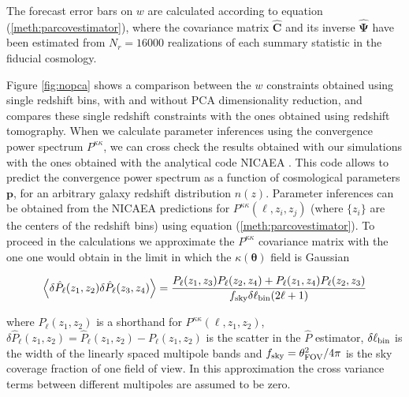\documentclass[reprint,aps,prd,superscriptaddress,showkeys,showpacs]{revtex4-1}
\newcommand{\bb}[1]{\mathbf{#1}}
\newcommand{\bbh}[1]{\mathbf{\hat{#1}}}
\newcommand{\h}[1]{\hat{#1}}
\begin{document}
The forecast error bars on $w$ are calculated according to equation (\ref{meth:parcovestimator}), where the covariance matrix $\bbh{C}$ and its inverse $\bbh{\Psi}$ have been estimated from $N_r=16000$ realizations of each summary statistic in the fiducial cosmology.

Figure \ref{fig:nopca} shows a comparison between the $w$ constraints obtained using single redshift bins, with and without PCA dimensionality reduction, and compares these single redshift constraints with the ones obtained using redshift tomography. When we calculate parameter inferences using the convergence power spectrum $P^{\kappa\kappa}$, we can cross check the results obtained with our simulations with the ones obtained with the analytical code NICAEA \citep{Nicaea}. This code allows to predict the convergence power spectrum as a function of cosmological parameters $\bb{p}$, for an arbitrary galaxy redshift distribution $n(z)$. Parameter inferences can be obtained from the NICAEA predictions for $P^{\kappa\kappa}(\ell,z_i,z_j)$ (where $\{z_i\}$ are the centers of the redshift bins) using equation (\ref{meth:parcovestimator}). To proceed in the calculations we approximate the $P^{\kappa\kappa}$ covariance matrix with the one one would obtain in the limit in which the $\kappa(\pmb{\theta})$ field is Gaussian

\begin{widetext}
\begin{equation}
\label{meth:gausspcov}
\left\langle\delta\h{P}_\ell(z_1,z_2)\delta\h{P}_\ell(z_3,z_4)\right\rangle = \frac{P_\ell(z_1,z_3)P_\ell(z_2,z_4)+P_\ell(z_1,z_4)P_\ell(z_2,z_3)}{f_{\rm sky}\delta\ell_{\rm bin}(2\ell+1)}
\end{equation} 
\end{widetext}
%
where $P_\ell(z_1,z_2)$ is a shorthand for $P^{\kappa\kappa}(\ell,z_1,z_2)$, $\delta\h{P}_\ell(z_1,z_2)=\h{P}_\ell(z_1,z_2) - P_\ell(z_1,z_2)$ is the scatter in the $\h{P}$ estimator, $\delta\ell_{\rm bin}$ is the width of the linearly spaced multipole bands and $f_{\rm sky} = \theta^2_{\rm FOV}/4\pi$ is the sky coverage fraction of one field of view. In this approximation the cross variance terms between different multipoles are assumed to be zero.   
\end{document}
